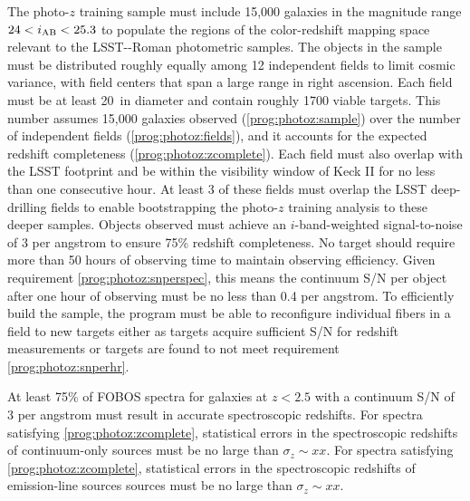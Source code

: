 \documentclass[11pt,a4paper,twoside,onecolumn,openany,final,oldfontcommands]{memoir}
\begin{document}
\begin{programrequirement}
\reqitem The photo-$z$ training sample must include 15,000 galaxies in the magnitude range $24 < i_{\rm AB} < 25.3$ to populate the regions of the color-redshift mapping space relevant to the LSST-\euclid-Roman photometric samples. \label{prog:photoz:sample}
\reqitem The objects in the sample must be distributed roughly equally among 12 independent fields to limit cosmic variance, with field centers that span a large range in right ascension. \label{prog:photoz:fields}
\reqitem Each field must be at least 20\arcmin\ in diameter and contain roughly 1700 viable targets.  This number assumes 15,000 galaxies observed (\ref{prog:photoz:sample}) over the number of independent fields (\ref{prog:photoz:fields}), and it accounts for the expected redshift completeness (\ref{prog:photoz:zcomplete}).
\reqitem Each field must also overlap with the LSST footprint and be within the visibility window of Keck II for no less than one consecutive hour.
\reqitem At least 3 of these fields must overlap the LSST deep-drilling fields to enable bootstrapping the photo-$z$ training analysis to these deeper samples.
\reqitem Objects observed must achieve an $i$-band-weighted signal-to-noise of 3 per angstrom to ensure 75\% redshift completeness. \label{prog:photoz:snperspec}
\reqitem No target should require more than 50 hours of observing time to maintain observing efficiency.  Given requirement \ref{prog:photoz:snperspec}, this means the continuum S/N per object after one hour of observing must be no less than 0.4 per angstrom. \label{prog:photoz:snperhr}
\reqitem To efficiently build the sample, the program must be able to reconfigure individual fibers in a field to new targets either as targets acquire sufficient S/N for redshift measurements or targets are found to not meet requirement \ref{prog:photoz:snperhr}.
\end{programrequirement}

\begin{sciencerequirement}
\reqitem At least 75\% of FOBOS spectra for galaxies at $z<2.5$ with a continuum S/N of 3 per angstrom must result in accurate spectroscopic redshifts. \label{prog:photoz:zcomplete}
\reqitem For spectra satisfying \ref{prog:photoz:zcomplete}, statistical errors in the spectroscopic redshifts of continuum-only sources must be no large than $\sigma_z \sim xx$.
\reqitem For spectra satisfying \ref{prog:photoz:zcomplete}, statistical errors in the spectroscopic redshifts of emission-line sources sources must be no large than $\sigma_z \sim xx$.
\end{sciencerequirement}
\end{document}
